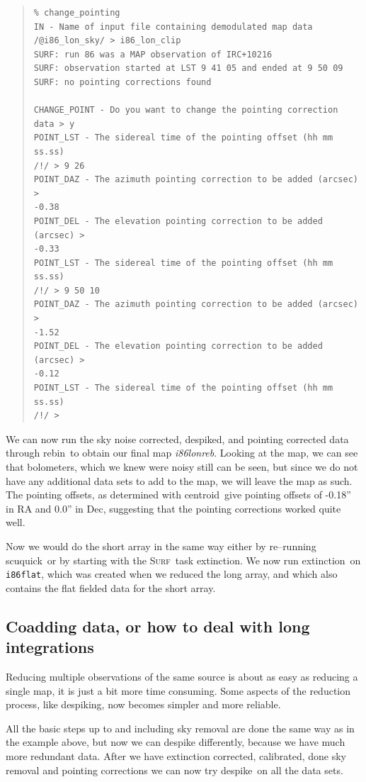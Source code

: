 \documentclass[twoside,11pt]{article}
\newenvironment{myquote}{\begin{quote}\begin{small}}{\end{small}\end{quote}}
\newcommand{\surf}{\xref{\textsc{Surf}}{sun216}{}}
\newcommand{\task}[1]{\textsf{#1}}
\newcommand{\rebin}{\xref{\task{rebin}}{sun216}{REBIN}}
\newcommand{\desp}{\xref{\task{despike}}{sun216}{DESPIKE}}
\newcommand{\ext}{\xref{\task{extinction}}{sun216}{EXTINCTION}}
\newcommand{\scuquick}{\xref{\task{scuquick}}{sun216}{SCUQUICK}}
\newcommand{\centroid}{\xref{\task{centroid}}{sun95}{CENTROID}}
\newcommand{\xref}[3]{#1}
\newcommand{\xlabel}[1]{}
\renewcommand{\_}{\texttt{\symbol{95}}}
\begin{document}
\begin{myquote}
\begin{verbatim}
% change_pointing
IN - Name of input file containing demodulated map data
/@i86_lon_sky/ > i86_lon_clip
SURF: run 86 was a MAP observation of IRC+10216
SURF: observation started at LST 9 41 05 and ended at 9 50 09
SURF: no pointing corrections found

CHANGE_POINT - Do you want to change the pointing correction data > y
POINT_LST - The sidereal time of the pointing offset (hh mm ss.ss)
/!/ > 9 26
POINT_DAZ - The azimuth pointing correction to be added (arcsec) >
-0.38
POINT_DEL - The elevation pointing correction to be added (arcsec) >
-0.33
POINT_LST - The sidereal time of the pointing offset (hh mm ss.ss)
/!/ > 9 50 10
POINT_DAZ - The azimuth pointing correction to be added (arcsec) >
-1.52
POINT_DEL - The elevation pointing correction to be added (arcsec) >
-0.12
POINT_LST - The sidereal time of the pointing offset (hh mm ss.ss)
/!/ >
\end{verbatim}
\end{myquote}

We can now run the sky noise corrected, despiked, and pointing corrected data
through \rebin\ to obtain our final map \textit{i86\_lon\_reb}.  Looking at
the map, we can see that bolometers, which we knew  were noisy still can
be seen, but since we do not have any additional data sets to add to the map,
we will leave the map as such.  The pointing offsets, as determined with
\centroid\ give pointing offsets of -0.18'' in RA and 0.0'' in Dec, suggesting
that the pointing corrections worked quite well.

Now we would do the short array in the same way either by re--running
\scuquick\ or by starting with the \surf\ task \ext. We now run \ext\
on \texttt{i86\_flat}, which was created when we reduced the long
array, and which also contains the flat fielded data for the short
array.

\subsection{\xlabel{Coadding_data}Coadding data, or how to deal with
long integrations \label{Coadding_data}}

Reducing multiple observations of the same source is about as easy as
reducing a single map, it is just a bit more time consuming. Some
aspects of the reduction process, like despiking, now becomes simpler
and more reliable.

All the basic steps up to and including sky removal are done the same
way as in the example above, but now we can despike differently,
because we have much more redundant data.  After we have extinction
corrected, calibrated, done sky removal and pointing corrections we
can now try \desp\ on all the data sets.
\end{document}
